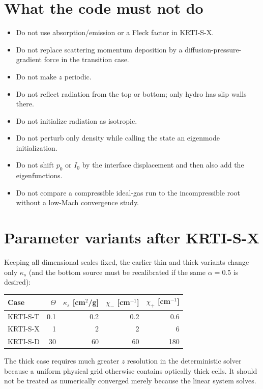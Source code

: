 \documentclass[11pt]{article}
\begin{document}
\section{What the code must not do}
\begin{itemize}[leftmargin=2em]
\item Do not use absorption/emission or a Fleck factor in KRTI-S-X.
\item Do not replace scattering momentum deposition by a diffusion-pressure-gradient force in the transition case.
\item Do not make $z$ periodic.
\item Do not reflect radiation from the top or bottom; only hydro has slip walls there.
\item Do not initialize radiation as isotropic.
\item Do not perturb only density while calling the state an eigenmode initialization.
\item Do not shift $p_0$ or $I_0$ by the interface displacement and then also add the eigenfunctions.
\item Do not compare a compressible ideal-gas run to the incompressible root without a low-Mach convergence study.
\end{itemize}

\section{Parameter variants after KRTI-S-X}
Keeping all dimensional scales fixed, the earlier thin and thick variants change only $\kappa_s$ (and the bottom source must be recalibrated if the same $\alpha=0.5$ is desired):
\begin{table}[H]
\centering
\begin{tabular}{lrrrr}
\toprule
Case & $\Theta$ & $\kappa_s$ [cm$^2$/g] & $\chi_-$ [cm$^{-1}$] & $\chi_+$ [cm$^{-1}$] \\
\midrule
KRTI-S-T & 0.1 & 0.2 & 0.2 & 0.6 \\
KRTI-S-X & 1 & 2 & 2 & 6 \\
KRTI-S-D & 30 & 60 & 60 & 180 \\
\bottomrule
\end{tabular}
\end{table}
The thick case requires much greater $z$ resolution in the deterministic solver because a uniform physical grid otherwise contains optically thick cells. It should not be treated as numerically converged merely because the linear system solves.
\end{document}
